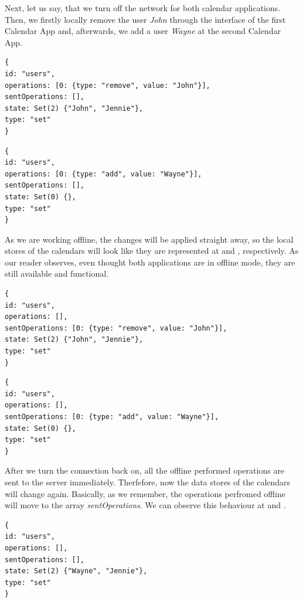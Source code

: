 Next, let us say, that we turn off the network for both calendar applications. Then, we firstly locally remove the user \textit{John} through the interface of the first Calendar App and, afterwards, we add a user \textit{Wayne} at the second Calendar App.

\begin{lstlisting}[caption={The state of the users object store after offline changes at the first Calendar App.}, label={lst:ev4}]
{
id: "users",
operations: [0: {type: "remove", value: "John"}],
sentOperations: [],
state: Set(2) {"John", "Jennie"},
type: "set"
}
\end{lstlisting}
\begin{lstlisting}[caption={The state of the users object store after offline changes at the second Calendar App.}, label={lst:ev5}]
{
id: "users",
operations: [0: {type: "add", value: "Wayne"}],
sentOperations: [],
state: Set(0) {},
type: "set"
}
\end{lstlisting}

As we are working offline, the changes will be applied straight away, so the local stores of the calendars will look like they are represented at  and , respectively. As our reader observes, even thought both applications are in offline mode, they are still available and functional. 

\begin{lstlisting}[caption={The state of the users object store after the connection is enabled at the first Calendar App.}, label={lst:ev6}]
{
id: "users",
operations: [],
sentOperations: [0: {type: "remove", value: "John"}],
state: Set(2) {"John", "Jennie"},
type: "set"
}
\end{lstlisting}
\begin{lstlisting}[caption={The state of the users object store after the connection is enabled at the second Calendar App.}, label={lst:ev7}]
{
id: "users",
operations: [],
sentOperations: [0: {type: "add", value: "Wayne"}],
state: Set(0) {},
type: "set"
}
\end{lstlisting}

After we turn the connection back on, all the offline performed operations are sent to the server immediately. Therfefore, now the data stores of the calendars will change again. Basically, as we remember, the operations perfromed offline will move to the array \textit{sentOperations}. We can observe this behaviour at  and .

\begin{lstlisting}[caption={The state of the users object store for both calendars.}, label={lst:ev8}]
{
id: "users",
operations: [],
sentOperations: [],
state: Set(2) {"Wayne", "Jennie"},
type: "set"
}
\end{lstlisting}

